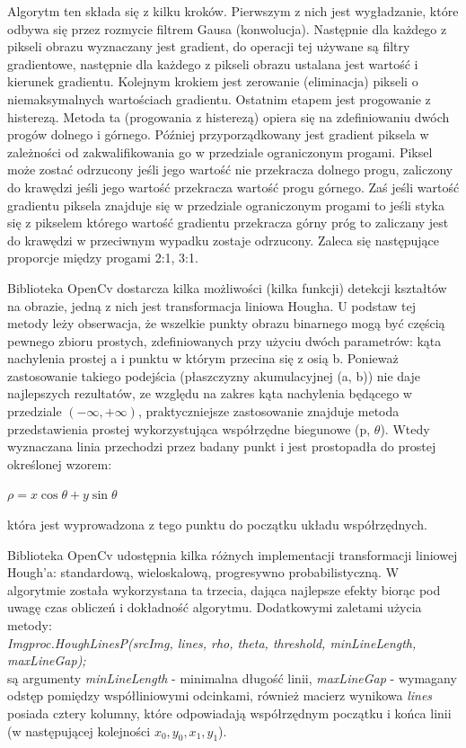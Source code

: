 \documentclass[a4paper,12pt]{article}
\begin{document}
		        Algorytm ten składa się z kilku kroków. Pierwszym z nich jest wygładzanie, które odbywa się przez rozmycie filtrem Gausa (konwolucja). Następnie dla każdego z pikseli obrazu wyznaczany jest gradient, do operacji tej używane są filtry gradientowe, następnie dla każdego z pikseli obrazu ustalana jest wartość i kierunek gradientu. Kolejnym krokiem jest zerowanie (eliminacja) pikseli o niemaksymalnych wartościach gradientu. Ostatnim etapem jest progowanie z histerezą. Metoda ta (progowania z histerezą) opiera się na zdefiniowaniu dwóch progów dolnego i górnego. Później przyporządkowany jest gradient piksela w zależności od zakwalifikowania go w przedziale ograniczonym progami. Piksel może zostać odrzucony jeśli jego wartość nie przekracza dolnego progu, zaliczony do krawędzi jeśli jego wartość przekracza wartość progu górnego. Zaś jeśli wartość gradientu piksela znajduje się w przedziale ograniczonym progami to jeśli styka się z pikselem którego wartość gradientu przekracza górny próg to zaliczany jest do krawędzi w przeciwnym wypadku zostaje odrzucony. Zaleca się następujące proporcje między progami 2:1, 3:1.
		
        		Biblioteka OpenCv dostarcza kilka możliwości (kilka funkcji) detekcji kształtów na obrazie, jedną z nich jest transformacja liniowa Hougha. U podstaw tej metody leży obserwacja, że wszelkie punkty obrazu binarnego mogą być częścią pewnego zbioru prostych, zdefiniowanych przy użyciu dwóch parametrów: kąta nachylenia prostej a i punktu w którym przecina się z osią b. 
		        Ponieważ zastosowanie takiego podejścia (płaszczyzny akumulacyjnej (a, b)) nie daje najlepszych rezultatów, ze względu na zakres kąta nachylenia będącego w przedziale $(-\infty, +\infty)$, praktyczniejsze zastosowanie znajduje metoda przedstawienia prostej wykorzystująca współrzędne biegunowe (p, $\theta$). Wtedy wyznaczana linia przechodzi przez badany punkt i jest prostopadła do prostej określonej wzorem:
		        \begin{center}
		        $\rho = x \cos \theta + y \sin \theta$ 
		        \end{center} 
		        która jest wyprowadzona z tego punktu do początku układu współrzędnych.
		
		        Biblioteka OpenCv udostępnia kilka różnych implementacji transformacji liniowej Hough'a: standardową, wieloskalową, progresywno probabilistyczną.
		        W algorytmie została wykorzystana ta trzecia, dająca najlepsze efekty biorąc pod uwagę czas obliczeń i dokładność algorytmu. Dodatkowymi zaletami użycia metody:\\ \textit {Imgproc.HoughLinesP(srcImg, lines, rho, theta, threshold, minLineLength, maxLineGap);}\\
		        są argumenty \textit{minLineLength} - minimalna długość linii, \textit{maxLineGap} - wymagany odstęp pomiędzy współliniowymi odcinkami, również macierz wynikowa \textit{lines} posiada cztery kolumny, które odpowiadają współrzędnym początku i końca linii (w następującej kolejności $ x_0, y_0, x_1, y_1 $).
		
\end{document}
